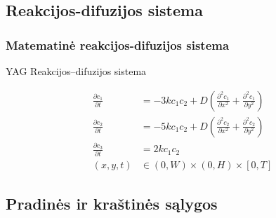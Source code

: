 \documentclass{beamer}
\begin{document}
\subsection{Reakcijos-difuzijos sistema}

\begin{frame}
\frametitle{Matematinė reakcijos-difuzijos sistema}

YAG Reakcijos--difuzijos sistema

\begin{align*}
    \frac{\partial c_1}{\partial t} & =-3kc_1c_2+D\left(\frac{\partial^2c_1}{\partial x^2}+\frac{\partial^2c_1}{\partial y^2}\right) \\
    \frac{\partial c_2}{\partial t} & =-5kc_1c_2+D\left(\frac{\partial^2c_2}{\partial x^2}+\frac{\partial^2c_2}{\partial y^2}\right)\\
    \frac{\partial c_3}{\partial t} & =2kc_1c_2\\
    (x, y, t)&\in(0, W)\times(0, H)\times[0, T]
\end{align*}

\end{frame}

\subsection{Pradinės ir kraštinės sąlygos}
\end{document}
